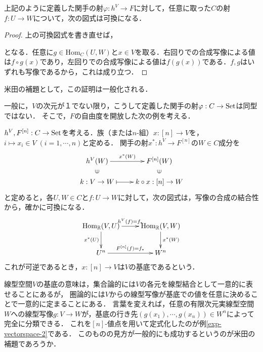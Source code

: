 \documentclass[uplatex, dvipdfmx]{jsreport}
\begin{document}
\begin{proposition}\label{prop-welldefinedness1}
    上記のように定義した関手の射$\varphi :h^V\to F$に対して，任意に取った$C$の射$f:U\to W$について，次の図式は可換になる．
    \begin{center}\end{center}
\end{proposition}
\begin{proof}
    上の可換図式を書き直せば，
    \begin{center}\end{center}
    となる．任意に$g\in\mathrm{Hom}_C(U,W)$と$x\in V$を取る．右回りでの合成写像による値は$f\circ g(x)$であり，左回りでの合成写像による値は$f(g(x))$である．$f,g$はいずれも写像であるから，これは成り立つ．
\end{proof}
\begin{remark}
    米田の補題として，この証明は一般化される．
\end{remark}

一般に，$V$の次元が１でない限り，こうして定義した関手の射$\varphi :C\to\mathrm{Set}$は同型ではない．
そこで，$F$の自由度を開放した次の例を考える．

\begin{example}\label{exp-vectorspace-2}
    $h^V,F^{[n]}:C\to\mathrm{Set}$を考える．族（または$n$-組）$x:[n]\to V$を，$i\mapsto x_i\in V\;(i=1,\cdots,n)$と定める．
    関手の射$x^*:h^V\to F^{[n]}$の$W\in C$成分を
    \[\xymatrix@R-2pc{
        h^V(W)\ar[r]^-{x^*(W)}&F^{[n]}(W)\\
        {\rotatebox{90}{$\in$}}&{\rotatebox{90}{$\in$}}\\
        k:V\to W\ar@{|->}[r]&k\circ x:[n]\to W
    }\]
    と定めると，各$U,W\in C$と$f:U\to W$に対して，次の図式は，写像の合成の結合性から，確かに可換になる．
    \[\xymatrix{
        \Hom_\R(V,U)\ar[r]^-{h^V(f)=f_*}\ar[d]_-{x^*(U)}&\Hom_\R(V,W)\ar[d]^-{x^*(W)}\\
        U^n\ar[r]^-{F^{[n]}(f)=f_*}&W^n
    }\]
    これが可逆であるとき，$x:[n]\to V$は$V$の基底であるという．
\end{example}
\begin{remark}
    線型空間$V$の基底の意味は，集合論的には$V$の各元を線型結合として一意的に表せることにあるが，
    圏論的には$V$からの線型写像が基底での値を任意に決めることで一意的に定まることにある．
    言葉を変えれば，任意の有限次元実線型空間$W$への線型写像$g:V\to W$が，基底の行き先$(g(x_1),\cdots,g(x_n))\in W^n$によって完全に分類できる．
    これを$[n]$-値点を用いて定式化したのが例\ref{exp-vectorspace-2}である．
    このものの見方が一般的にも成功するというのが米田の補題であろうか．
\end{remark}
\end{document}
